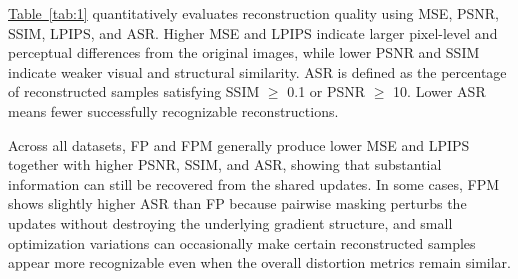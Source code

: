 \documentclass[a4paper,fleqn]{cas-dc}
\newcommand{\xtab}[1]{\hyperref[#1]{Table~\ref*{#1}}}
\begin{document}
\xtab{tab:1} quantitatively evaluates reconstruction quality using MSE, PSNR, SSIM, LPIPS, and ASR. Higher MSE and LPIPS indicate larger pixel-level and perceptual differences from the original images, while lower PSNR and SSIM indicate weaker visual and structural similarity. ASR is defined as the percentage of reconstructed samples satisfying SSIM $\geq$ 0.1 or PSNR $\geq$ 10. Lower ASR means fewer successfully recognizable reconstructions.

Across all datasets, FP and FPM generally produce lower MSE and LPIPS together with higher PSNR, SSIM, and ASR, showing that substantial information can still be recovered from the shared updates. In some cases, FPM shows slightly higher ASR than FP because pairwise masking perturbs the updates without destroying the underlying gradient structure, and small optimization variations can occasionally make certain reconstructed samples appear more recognizable even when the overall distortion metrics remain similar.
\end{document}
